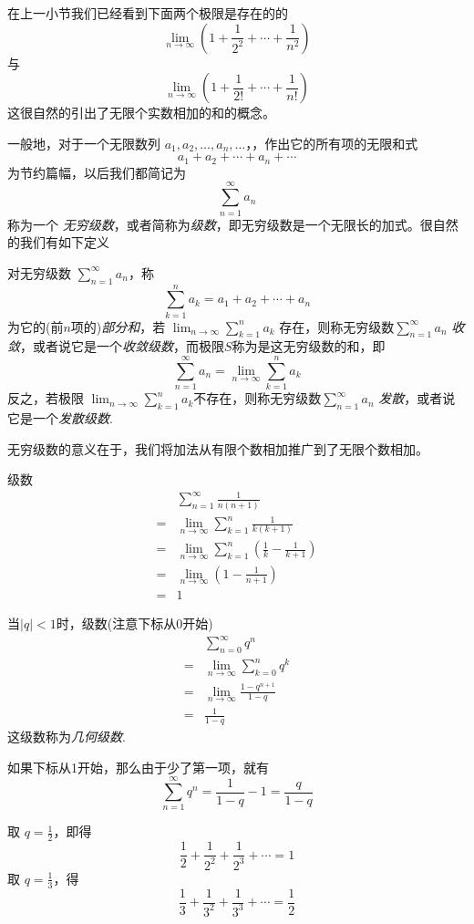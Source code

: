 在上一小节我们已经看到下面两个极限是存在的的
\[ \lim_{n\to\infty} \left( 1+\frac{1}{2^2}+\cdots+\frac{1}{n^2} \right) \]
与
\[ \lim_{n\to\infty} \left( 1 + \frac{1}{2!}+\cdots+\frac{1}{n!} \right) \]
这很自然的引出了无限个实数相加的和的概念。

一般地，对于一个无限数列 $a_1,a_2,\ldots,a_n,\ldots$，，作出它的所有项的无限和式
\[ a_1+a_2+\cdots+a_n+\cdots \]
为节约篇幅，以后我们都简记为
\[ \sum_{n=1}^{\infty}a_n \]
称为一个 \emph{无穷级数}，或者简称为\emph{级数}，即无穷级数是一个无限长的加式。很自然的我们有如下定义
\begin{definition}[无穷级数收敛性]
  对无穷级数 $\sum_{n=1}^{\infty}a_n$，称
  \[ \sum_{k=1}^na_k=a_1+a_2+\cdots+a_n \]
  为它的(前$n$项的)\emph{部分和}，若 $\lim_{n\to\infty}\sum_{k=1}^na_k$ 存在，则称无穷级数$\sum_{n=1}^{\infty}a_n$ \emph{收敛}，或者说它是一个\emph{收敛级数}，而极限$S$称为是这无穷级数的和，即
  \[ \sum_{n=1}^{\infty}a_n = \lim_{n\to\infty}\sum_{k=1}^na_k  \]
  反之，若极限 $\lim_{n\to\infty}\sum_{k=1}^na_k$不存在，则称无穷级数$\sum_{n=1}^{\infty}a_n$ \emph{发散}，或者说它是一个\emph{发散级数}.
\end{definition}

无穷级数的意义在于，我们将加法从有限个数相加推广到了无限个数相加。

\begin{example}
  级数
  \begin{equation*}
    \begin{split}
      & \sum_{n=1}^{\infty}\frac{1}{n(n+1)} \\
      = &  \lim_{n\to\infty} \sum_{k=1}^{n}\frac{1}{k(k+1)} \\
    = &  \lim_{n\to\infty} \sum_{k=1}^{n} \left( \frac{1}{k} - \frac{1}{k+1} \right)  \\
    = & \lim_{n\to\infty} \left( 1 - \frac{1}{n+1} \right) \\
    =  & 1
    \end{split}
  \end{equation*}
\end{example}

\begin{example}
  当$|q|<1$时，级数(注意下标从0开始)
  \begin{equation*}
    \begin{split}
      &  \sum_{n=0}^{\infty}q^n \\
      = & \lim_{n\to\infty} \sum_{k=0}^{n}q^k \\
      = & \lim_{n\to\infty} \frac{1-q^{n+1}}{1-q} \\
      = & \frac{1}{1-q}
    \end{split}
  \end{equation*}
  这级数称为\emph{几何级数}.

  如果下标从1开始，那么由于少了第一项，就有
  \[ \sum_{n=1}^{\infty}q^n = \frac{1}{1-q}-1 = \frac{q}{1-q} \]

  取 $q=\frac{1}{2}$，即得
  \[ \frac{1}{2} + \frac{1}{2^2} + \frac{1}{2^3} + \cdots = 1 \]
  取 $q=\frac{1}{3}$，得
  \[ \frac{1}{3} + \frac{1}{3^2} + \frac{1}{3^3} + \cdots = \frac{1}{2} \]
\end{example}

